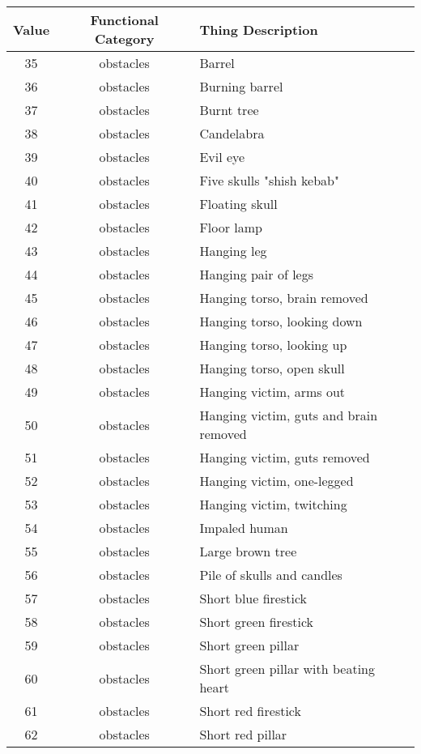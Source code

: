 		\begin{table}[b]
			\centering
			\begin{tabularx}{\textwidth}{| c | c | X | }
				\hline
				\textbf{Value} & \textbf{Functional Category} & \textbf{Thing Description} \\
				\hline
		
		35	& obstacles	& Barrel \\
		36	& obstacles	& Burning barrel \\
		37	& obstacles	& Burnt tree \\
		38	& obstacles	& Candelabra \\
		39	& obstacles	& Evil eye \\
		40	& obstacles	& Five skulls "shish kebab" \\
		41	& obstacles	& Floating skull \\
		42	& obstacles	& Floor lamp \\
		43	& obstacles	& Hanging leg \\
		44	& obstacles	& Hanging pair of legs \\
		45	& obstacles	& Hanging torso, brain removed \\
		46	& obstacles	& Hanging torso, looking down \\
		47	& obstacles	& Hanging torso, looking up \\
		48	& obstacles	& Hanging torso, open skull \\
		49	& obstacles	& Hanging victim, arms out \\
		50	& obstacles	& Hanging victim, guts and brain removed \\
		51	& obstacles	& Hanging victim, guts removed \\
		52	& obstacles	& Hanging victim, one-legged \\
		53	& obstacles	& Hanging victim, twitching \\
		54	& obstacles	& Impaled human \\
		55	& obstacles	& Large brown tree \\
		56	& obstacles	& Pile of skulls and candles \\
		57	& obstacles	& Short blue firestick \\
		58	& obstacles	& Short green firestick \\
		59	& obstacles	& Short green pillar \\
		60	& obstacles	& Short green pillar with beating heart \\
		61	& obstacles	& Short red firestick \\
		62	& obstacles	& Short red pillar \\

\end{tabularx}
\end{table}
